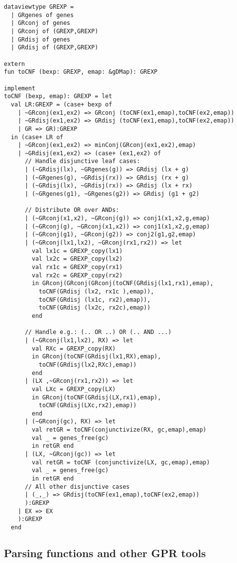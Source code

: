 \begin{verbatim}
dataviewtype GREXP = 
  | GRgenes of genes
  | GRconj of genes
  | GRconj of (GREXP,GREXP)
  | GRdisj of genes
  | GRdisj of (GREXP,GREXP)

extern
fun toCNF (bexp: GREXP, emap: &gDMap): GREXP

implement
toCNF (bexp, emap): GREXP = let     
  val LR:GREXP = (case+ bexp of 
    | ~GRconj(ex1,ex2) => GRconj (toCNF(ex1,emap),toCNF(ex2,emap))
    | ~GRdisj(ex1,ex2) => GRdisj (toCNF(ex1,emap),toCNF(ex2,emap))   
    | GR => GR):GREXP
  in (case+ LR of  
    | ~GRconj(ex1,ex2) => minConj(GRconj(ex1,ex2),emap) 
    | ~GRdisj(ex1,ex2) => (case+ (ex1,ex2) of
      // Handle disjunctive leaf cases:         
      | (~GRdisj(lx), ~GRgenes(g)) => GRdisj (lx + g) 
      | (~GRgenes(g), ~GRdisj(rx)) => GRdisj (rx + g)
      | (~GRdisj(lx), ~GRdisj(rx)) => GRdisj (lx + rx)
      | (~GRgenes(g1), ~GRgenes(g2)) => GRdisj (g1 + g2)

      // Distribute OR over ANDs:
      | (~GRconj(x1,x2), ~GRconj(g)) => conj1(x1,x2,g,emap) 
      | (~GRconj(g), ~GRconj(x1,x2)) => conj1(x1,x2,g,emap) 
      | (~GRconj(g1), ~GRconj(g2)) => conj2(g1,g2,emap)
      | (~GRconj(lx1,lx2), ~GRconj(rx1,rx2)) => let
        val lx1c = GREXP_copy(lx1)
        val lx2c = GREXP_copy(lx2) 
        val rx1c = GREXP_copy(rx1)
        val rx2c = GREXP_copy(rx2) 
        in GRconj(GRconj(GRconj(toCNF(GRdisj(lx1,rx1),emap), 
          toCNF(GRdisj (lx2, rx1c ),emap)),
          toCNF(GRdisj (lx1c, rx2),emap)), 
          toCNF(GRdisj (lx2c, rx2c),emap)) 
        end

      // Handle e.g.: (.. OR ..) OR (.. AND ...) 
      | (~GRconj(lx1,lx2), RX) => let
        val RXc = GREXP_copy(RX)
        in GRconj(toCNF(GRdisj(lx1,RX),emap),
          toCNF(GRdisj(lx2,RXc),emap)) 
        end
      | (LX ,~GRconj(rx1,rx2)) => let
        val LXc = GREXP_copy(LX)
        in GRconj(toCNF(GRdisj(LX,rx1),emap),
          toCNF(GRdisj(LXc,rx2),emap)) 
        end
      | (~GRconj(gc), RX) => let
        val retGR = toCNF(conjunctivize(RX, gc,emap),emap)
        val _ = genes_free(gc)
        in retGR end
      | (LX, ~GRconj(gc)) => let
        val retGR = toCNF (conjunctivize(LX, gc,emap),emap)
        val _ = genes_free(gc)
        in retGR end
      // All other disjunctive cases
      | (_,_) => GRdisj(toCNF(ex1,emap),toCNF(ex2,emap))
      ):GREXP
    | EX => EX
    ):GREXP
  end
\end{verbatim}

\subsection{Parsing functions and other GPR tools}
\label{ssec:parsing}

